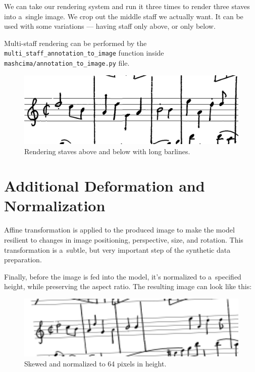 We can take our rendering system and run it three times to render three staves into a~single image. We crop out the middle staff we actually want. It can be used with some variations --- having staff only above, or only below.

Multi-staff rendering can be performed by the \verb`multi_`\allowbreak\verb`staff_`\allowbreak\verb`annotation_`\allowbreak\verb`to_image` function inside \verb`mashcima/`\allowbreak\verb`annotation_`\allowbreak\verb`to_image.py` file.

\begin{figure}[h]
    \centering
    \includegraphics[width=120mm]{../img/multi-staff}
    \caption{Rendering staves above and below with long barlines.}
    \label{fig5:MultiStaff}
\end{figure}


\section{Additional Deformation and Normalization}

Affine transformation is applied to the produced image to make the model resilient to changes in image positioning, perspective, size, and rotation. This transformation is a~subtle, but very important step of the synthetic data preparation.

Finally, before the image is fed into the model, it's normalized to a~specified height, while preserving the aspect ratio. The resulting image can look like this:

\begin{figure}[h]
    \centering
    \includegraphics[width=120mm]{../img/normalized-image}
    \caption{Skewed and normalized to 64 pixels in height.}
    \label{fig5:NormalizedImage}
\end{figure}


